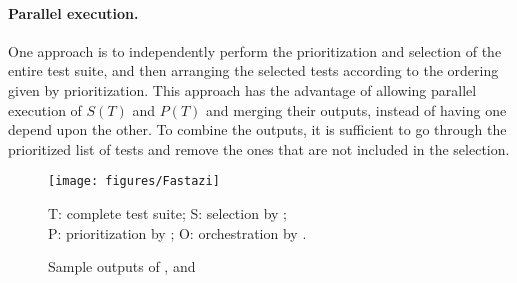 \paragraph{Parallel execution.} 
One approach is to independently perform the prioritization and selection of the entire test suite, and then arranging the selected tests according to the ordering given by prioritization.
This approach has the advantage of allowing parallel execution of $S(T)$ and $P(T)$ and merging their outputs, instead of having one depend upon the other.
To combine the outputs, it is sufficient to go through the prioritized list of tests and remove the ones that are not included in the selection.

\begin{figure}[t]
  \centering
    \texttt{[image: figures/Fastazi]}
    \begin{center}
  	\footnotesize
  	T: complete test suite; S: selection by \ek;\\ P: prioritization by \fs; O: orchestration by \fz. 
	\end{center}

    \caption{Sample outputs of \ek, \fs and \fz}
    \label{fig:fastazi}
\end{figure}





